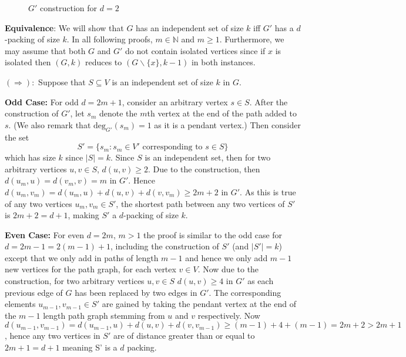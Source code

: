 \documentclass[10pt, a4paper]{article}
\theoremstyle{definition}
\newcommand{\N}{\mathbb{N}}
\newcommand{\bs}{\backslash}
\begin{document}
\begin{figure}[ht]
\begin{minipage}{.5\textwidth}
	\caption{$G'$ construction for $d = 2$}
\end{minipage}
\end{figure}

\clearpage

\textbf{Equivalence}: We will show that $G$ has an independent set of size $k$ iff $G'$ has a $d$-packing of size $k$.  In all following proofs, $m \in \N$ and $m \geq 1$. Furthermore, we may assume that both $G$ and $G'$ do not contain isolated vertices since if $x$ is isolated then $(G,k)$ reduces to $(G\bs\{x\},k-1)$ in both instances. 

$(\Rightarrow):$ Suppose that $S \subseteq V$ is an independent set of size $k$ in $G$.

\textbf{Odd Case:} For odd $d = 2m+1$, consider an arbitrary vertex $s \in S$. After the construction of $G'$, let $s_m$ denote the $m$th vertex at the end of the path added to $s$. (We also remark that $\mathrm{deg}_{G'}(s_m) = 1$ as it is a pendant vertex.) Then consider the set
\[ S' = \{ s_m : s_m \in V' \text{ corresponding to } s \in S \}\]
which has size $k$ since $|S| = k$.
Since $S$ is an independent set, then for two arbitrary vertices $u,v \in S$, $d(u,v) \geq 2$. Due to the construction, then $d(u_m,u) = d(v_m,v) = m$ in $G'$. Hence $d(u_m,v_m) = d(u_m,u) + d(u,v) + d(v,v_m) \geq 2m + 2$ in $G'$. As this is true of any two vertices $u_m, v_m \in S'$, the shortest path between any two vertices of $S'$ is $2m+2 = d+ 1$, making $S'$ a $d$-packing of size $k$.

\textbf{Even Case:} For even $d = 2m$, $m > 1$ the proof is similar to the odd case for $d = 2m - 1 = 2(m-1) + 1$, including the construction of $S'$ (and $|S'| = k$) except that we only add in paths of length $m-1$ and hence we only add $m-1$ new vertices for the path graph, for each vertex $v \in V$. Now due to the construction, for two arbitrary vertices $u,v \in S$ $d(u,v) \geq 4$ in $G'$ as each previous edge of $G$ has been replaced by two edges in $G'$. The corresponding elements $u_{m-1}, v_{m-1} \in S'$ are gained by taking the pendant vertex at the end of the $m-1$ length path graph stemming from $u$ and $v$ respectively. Now $d(u_{m-1},v_{m-1}) = d(u_{m-1},u) + d(u,v) + d(v,v_{m-1}) \geq (m - 1) + 4 + (m-1) = 2m + 2 > 2m + 1$, hence any two vertices in $S'$ are of distance greater than or equal to $2m + 1 = d+1$ meaning S' is a $d$ packing.
\end{document}
